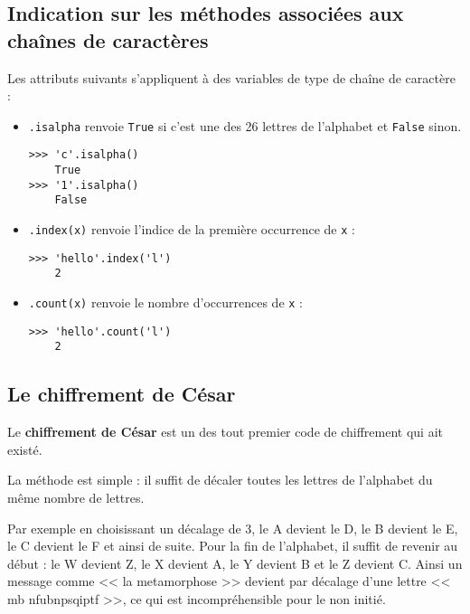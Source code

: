 \exer{}
\setcounter{numques}{0}



\setcounter{section}{1}

\subsection{Indication sur les méthodes associées aux chaînes de caractères}

Les attributs suivants s'appliquent à des variables de type de chaîne de caractère :
\begin{itemize}
\item \texttt{.isalpha} renvoie \texttt{True} si c'est une des 26 lettres de l'alphabet et \texttt{False} sinon.
\begin{lstlisting}
>>> 'c'.isalpha()
	True
>>> '1'.isalpha()
	False
\end{lstlisting}
\item \texttt{.index(x)} renvoie l'indice de la première occurrence de \texttt{x} :
\begin{lstlisting}
>>> 'hello'.index('l')
	2
\end{lstlisting}
\item \texttt{.count(x)} renvoie le nombre d'occurrences de \texttt{x} :
\begin{lstlisting}
>>> 'hello'.count('l')
	2
\end{lstlisting}
\end{itemize}

\subsection{Le chiffrement de César}



Le \textbf{chiffrement de César} est un des tout premier code de chiffrement qui ait existé. 

La méthode est simple : il suffit de décaler toutes les lettres de l'alphabet du même nombre de lettres. 



Par exemple en choisissant un décalage de 3, le A devient le D, le B devient le E, le C devient le F et ainsi de suite. Pour la fin de l'alphabet, il suffit de revenir au début : le W devient Z, le X devient A, le Y devient B et le Z devient C. Ainsi un message comme << la metamorphose >> devient par décalage d'une lettre << mb nfubnpsqiptf >>, ce qui est incompréhensible pour le non initié.





